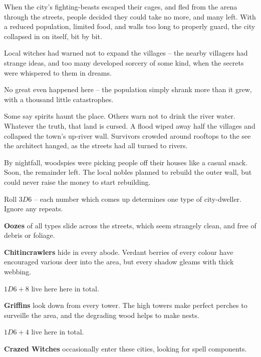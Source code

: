 \begin{multicols}{2}
\begin{dlist}
  When the city's fighting-beasts escaped their cages, and fled from the arena through the streets, people decided they could take no more, and many left.
  With a reduced population, limited food, and walls too long to properly guard, the city collapsed in on itself, bit by bit.
  \item
  \ifodd\value{r4}
    Local witches had warned not to expand the villages -- the nearby villagers had strange ideas, and too many developed sorcery of some kind, when the secrets were whispered to them in dreams.

    No great even happened here -- the population simply shrank more than it grew, with a thousand little catastrophes.

    Some say spirits haunt the place.
    Others warn not to drink the river water.
    Whatever the truth, that land is cursed.
  \else
    A flood wiped away half the villages and collapsed the town's up-river wall.
    Survivors crowded around rooftops to the see the architect hanged, as the streets had all turned to rivers.

    By nightfall, woodspies were picking people off their houses like a casual snack.
    Soon, the remainder left.
    The local nobles planned to rebuild the outer wall, but could never raise the money to start rebuilding.
  \fi
\end{dlist}


Roll $3D6$ -- each number which comes up determines one type of city-dweller.
Ignore any repeats.

\begin{dlist}
  \item\label{lostOoze}
  \textbf{Oozes} of all types slide across the streets, which seem strangely clean, and free of debris or foliage.
  \item
  \textbf{Chitincrawlers} hide in every abode.
  Verdant berries of every colour have encouraged various deer into the area, but every shadow gleams with thick webbing.

  $1D6+8$ live here here in total.
  \item
  \textbf{Griffins} look down from every tower.
  The high towers make perfect perches to surveille the area, and the degrading wood helps to make nests.

  $1D6+4$ live here in total.
  \item
  \textbf{Crazed Witches} occasionally enter these cities, looking for spell components.


\end{dlist}
\end{multicols}
